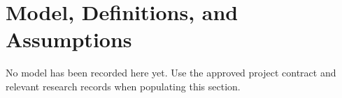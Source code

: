 \section{Model, Definitions, and Assumptions}
\label{sec:model}

No model has been recorded here yet. Use the approved project contract and
relevant research records when populating this section.
